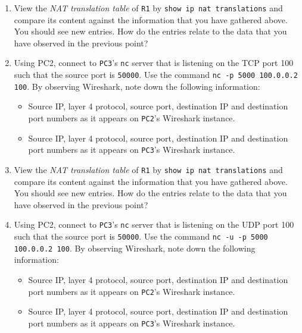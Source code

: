 \documentclass[pdftex,12pt,a4paper]{article}
\begin{document}
\begin{enumerate}
                    \item View the \emph{NAT translation table} of \texttt{R1}
                        by \texttt{show ip nat translations} and compare its
                        content against the information that you have gathered
                        above. You should see new entries. How do the entries
                        relate to the data that you have observed in the
                        previous point?

                    \item Using PC2, connect to \texttt{PC3}'s \texttt{nc} server that is
                        listening on the TCP port 100 such that the source port is
                        \texttt{50000}. Use the command \texttt{nc -p 5000
                        100.0.0.2 100}. By observing Wireshark, note down the following
                        information:
                        \begin{itemize}
                            \item Source IP, layer 4 protocol, source port, destination IP and
                                destination port numbers as it appears on
                                \texttt{PC2}'s Wireshark instance.
                            \item Source IP, layer 4 protocol, source port, destination IP and
                                destination port numbers as it appears on
                                \texttt{PC3}'s Wireshark instance.
                        \end{itemize}

                    \item View the \emph{NAT translation table} of \texttt{R1}
                        by \texttt{show ip nat translations} and compare its
                        content against the information that you have gathered
                        above. You should see new entries. How do the entries
                        relate to the data that you have observed in the
                        previous point?

                    \item Using PC2, connect to \texttt{PC3}'s \texttt{nc} server that is
                        listening on the UDP port 100 such that the source port is
                        \texttt{50000}. Use the command \texttt{nc -u -p 5000
                        100.0.0.2 100}. By observing Wireshark, note down the following
                        information:
                        \begin{itemize}
                            \item Source IP, layer 4 protocol, source port, destination IP and
                                destination port numbers as it appears on
                                \texttt{PC2}'s Wireshark instance.
                            \item Source IP, layer 4 protocol, source port, destination IP and
                                destination port numbers as it appears on
                                \texttt{PC3}'s Wireshark instance.
                        \end{itemize}


\end{enumerate}
\end{document}
